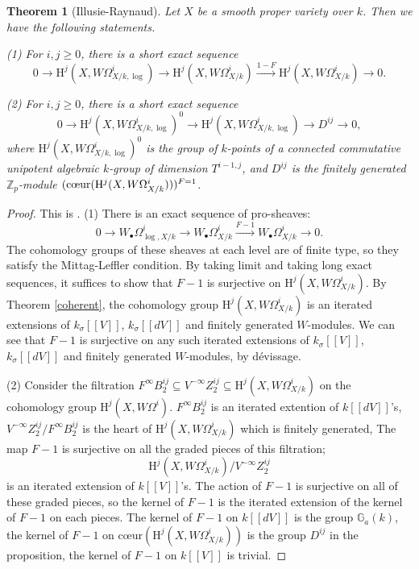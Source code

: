 \documentclass[a4paper,12pt,twoside]{report}
\newtheorem{theorem}{Theorem}[section]
\newcommand{\Z}{\mathbb{Z}}
\newcommand{\G}{\mathbb{G}}
\newcommand{\HH}{\mathrm{H}}
\begin{document}
\begin{theorem}[Illusie-Raynaud]\label{IllusieRaynaud}
    Let $X$ be a smooth proper variety over $k$. Then we have the following statements.

{\rm  (1)} For $i,j\geqslant 0$, there is a short exact sequence 
    \[0\rightarrow \HH^j(X,W\Omega_{X/k,\log}^i) \rightarrow \HH^j(X,W\Omega^{i}_{X/k}) \xrightarrow{1-F} \HH^j(X,W\Omega^{i}_{X/k}) \rightarrow 0.\] 

{\rm  (2)} For $i,j\geqslant 0$, there is a short exact sequence 
    \[0 \rightarrow \HH^j(X,W\Omega_{X/k,\log}^i)^0 \rightarrow \HH^j(X,W\Omega_{X/k,\log}^i) \rightarrow D^{ij} \rightarrow 0,\]
    where $\HH^j(X,W\Omega_{X/k,\log}^i)^0$ is the group of $k$-points of a connected commutative unipotent algebraic $k$-group of dimension $T^{{i-1},j}$,
    and $D^{ij}$ is the finitely generated $\Z_p$-module
$ (\text{\rm {c\oe ur}}(\HH^j(X,W\Omega^i_{X/k})))^{F=1}$. 
\end{theorem}

\begin{proof} This is \cite[Theorem IV.3.3]{IR}. (1) There is an exact sequence of pro-sheaves: 
\[0\rightarrow W_{\bullet}\Omega^i_{\log,X/k} \rightarrow W_\bullet\Omega^i_{X/k} \xrightarrow{F-1}  W_\bullet\Omega^i_{X/k} \rightarrow 0.\]
The cohomology groups of these sheaves at each level are of finite type, so they satisfy the Mittag-Leffler condition. 
By taking limit and taking long exact sequences, 
it suffices to show that $F-1$ is surjective on $\HH^j(X,W\Omega^i_{X/k})$. 
By Theorem \ref{coherent}, the cohomology group $\HH^j(X,W\Omega^i_{X/k})$ 
is an iterated extensions of $k_{\sigma}[[V]]$, $k_{\sigma}[[dV]]$ and finitely generated $W$-modules. 
We can see that $F-1$ is surjective on any such iterated extensions of $k_{\sigma}[[V]]$, 
$k_{\sigma}[[dV]]$ and finitely generated $W$-modules, by d\'evissage. 

(2) Consider the filtration $F^\infty B_2^{ij}\subseteq V^{-\infty}Z_2^{ij}\subseteq \HH^j(X,W\Omega^i_{X/k})$ 
on the cohomology group $\HH^j(X,W\Omega^i)$. 
$F^\infty B_2^{ij}$ is an iterated extention of $k[[dV]]$'s, $V^{-\infty}Z_2^{ij}/F^\infty B_2^{ij}$ 
is the heart of $\HH^j(X,W\Omega^i_{X/k})$ which is finitely generated, 
The map $F-1$ is surjective on all the graded pieces of this filtration; 
$$\HH^j(X,W\Omega^i_{X/k})/ V^{-\infty}Z_2^{ij}$$ is an iterated extension of $k[[V]]$'s.
The action of $F-1$ is surjective on all of these graded pieces, 
so the kernel of $F-1$ is the iterated extension of the kernel of $F-1$ on each pieces. 
The kernel of $F-1$ on $k[[dV]]$ is the group $\G_a(k)$, the kernel of $F-1$ on $\text{c\oe ur}(\HH^j(X,W\Omega^i_{X/k}))$ is the group $D^{ij}$ in the proposition, 
the kernel of $F-1$ on $k[[V]]$ is trivial. 
\end{proof}
    
\end{document}
